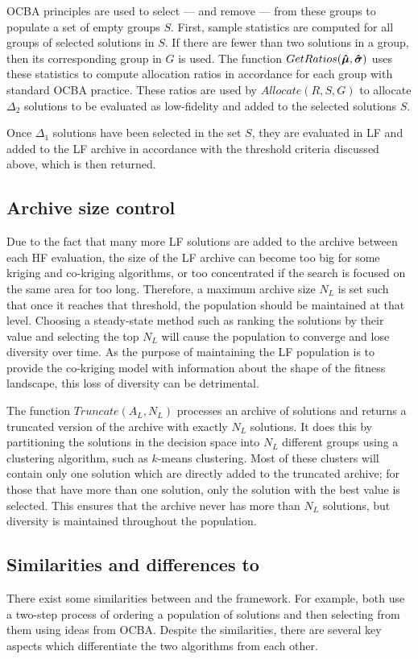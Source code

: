 OCBA principles are used to select --- and remove --- from these groups to populate a set of empty groups $S$. First, sample statistics are computed for all groups of selected solutions in $S$. If there are fewer than two solutions in a group, then its corresponding group in $G$ is used. The function $GetRatios(\boldsymbol{\hat{\mu}},\boldsymbol{\hat{\sigma}})$ uses these statistics to compute allocation ratios in accordance for each group with standard OCBA practice. These ratios are used by $Allocate(R,S,G)$ to allocate $\Delta_2$ solutions to be evaluated as low-fidelity and added to the selected solutions $S$.

Once $\Delta_1$ solutions have been selected in the set $S$, they are evaluated in LF and added to the LF archive in accordance with the threshold criteria discussed above, which is then returned.

\subsection{Archive size control}
Due to the fact that many more LF solutions are added to the archive between each HF evaluation, the size of the LF archive can become too big for some kriging and co-kriging algorithms, or too concentrated if the search is focused on the same area for too long. Therefore, a maximum archive size $N_L$ is set such that once it reaches that threshold, the population should be maintained at that level. Choosing a steady-state method such as ranking the solutions by their value and selecting the top $N_L$ will cause the population to converge and lose diversity over time. As the purpose of maintaining the LF population is to provide the co-kriging model with information about the shape of the fitness landscape, this loss of diversity can be detrimental. 

The function $Truncate(A_L,N_L)$ processes an archive of solutions and returns a truncated version of the archive with exactly $N_L$ solutions. It does this by partitioning the solutions in the decision space into $N_L$ different groups using a clustering algorithm, such as $k$-means clustering. Most of these clusters will contain only one solution which are directly added to the truncated archive; for those that have more than one solution, only the solution with the best value is selected. This ensures that the archive never has more than $N_L$ solutions, but diversity is maintained throughout the population.

\subsection{Similarities and differences to \motos{}}
There exist some similarities between \AlgName{} and the \motos{} framework. For example, both use a two-step process of ordering a population of solutions and then selecting from them using ideas from OCBA. Despite the similarities, there are several key aspects which differentiate the two algorithms from each other. 

